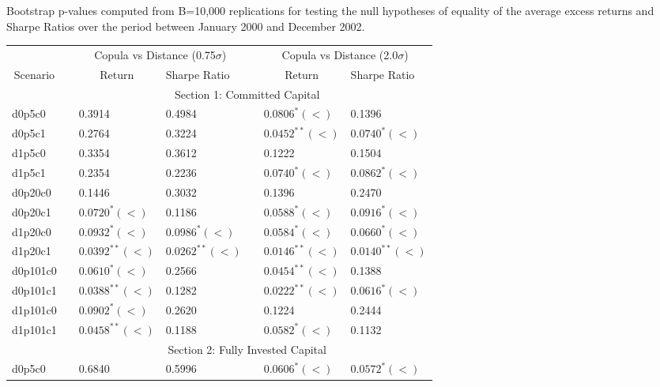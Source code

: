 \documentclass[a4paper]{article}
\begin{document}
\medskip

\begin{threeparttable}[H]
	\centering \scriptsize
	\caption{Bootstrap p-values computed from B=10,000 replications for testing the null hypotheses of equality of the average excess returns and Sharpe Ratios over the period between January 2000 and December 2002.}
	\begin{tabularx}{\textwidth}{@{\extracolsep{\fill}}lllllll@{}}
		\toprule
		& & \multicolumn{2}{c}{Copula vs Distance (0.75$\sigma$)} & \multicolumn{1}{c}{} & \multicolumn{2}{c}{Copula vs Distance (2.0$\sigma$)} \\
		\cmidrule{3-4}  \cmidrule{6-7}
		\multicolumn{1}{c}{Scenario} & & \multicolumn{1}{c}{Return} & Sharpe Ratio &       & \multicolumn{1}{c}{Return}& Sharpe Ratio \\
		\midrule
		& \multicolumn{6}{c}{Section 1: Committed Capital} \\
		\midrule
		d0p5c0 & & 0.3914 & 0.4984 &       & $0.0806^{*}(<)$ & 0.1396 \\
		d0p5c1 & & 0.2764 & 0.3224 &       & $0.0452^{**}(<)$ & $0.0740^{*}(<)$ \\
		d1p5c0 & & 0.3354 & 0.3612 &       & 0.1222 & 0.1504 \\
		d1p5c1 & & 0.2354 & 0.2236 &       & $0.0740^{*}(<)$ & $0.0862^{*}(<)$ \\
		d0p20c0 & & 0.1446 & 0.3032 &       & 0.1396 & 0.2470 \\
		d0p20c1 & & $0.0720^{*}(<)$ & 0.1186 &       & $0.0588^{*}(<)$ & $0.0916^{*}(<)$ \\
		d1p20c0 & & $0.0932^{*}(<)$ & $0.0986^{*}(<)$ &       & $0.0584^{*}(<)$ & $0.0660^{*}(<)$ \\
		d1p20c1 & & $0.0392^{**}(<)$ & $0.0262^{**}(<)$ &       & $0.0146^{**}(<)$ & $0.0140^{**}(<)$ \\
		d0p101c0 & & $0.0610^{*}(<)$ & 0.2566 &       & $0.0454^{**}(<)$ & 0.1388 \\
		d0p101c1 & & $0.0388^{**}(<)$ & 0.1282 &       & $0.0222^{**}(<)$ & $0.0616^{*}(<)$ \\
		d1p101c0 & & $0.0902^{*}(<)$ & 0.2620 &       & 0.1224 & 0.2444 \\
		d1p101c1 & & $0.0458^{**}(<)$ & 0.1188 &       & $0.0582^{*}(<)$ & 0.1132 \\
		\midrule
		& \multicolumn{6}{c}{Section 2:  Fully Invested Capital } \\
		\midrule
		d0p5c0 & & 0.6840 & 0.5996 &       & $0.0606^{*}(<)$ & $0.0572^{*}(<)$ \\

\end{tabularx}
\end{threeparttable}
\end{document}
